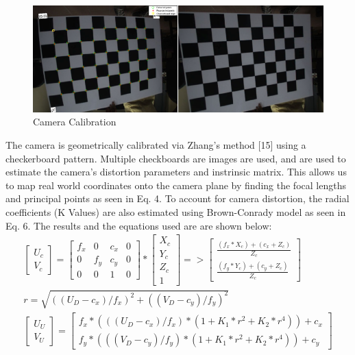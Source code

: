\documentclass[a4paper]{IEEEtran}
\begin{document}
\begin{figure}[h!]
  \centering
  \includegraphics[scale=0.3]{camera}
  \captionsetup{justification=centering}
  \caption{Camera Calibration}
\end{figure}

The camera is geometrically calibrated via Zhang’s method [15] using a checkerboard pattern. Multiple checkboards are images are used, and are used to estimate the camera’s distortion parameters and instrinsic matrix. This allows us to map real world coordinates onto the camera plane by finding the focal lengths and principal points as seen in Eq. 4. To account for camera distortion, the radial coefficients (K Values) are also estimated using Brown-Conrady model as seen in Eq. 6. The results and the equations used are are shown below:
\begingroup\makeatletter\def\f@size{7}\check@mathfonts
\begin{gather}
\left[\begin{array}{c}
U_{c}\\
V_{c}
\end{array}\right]=\left[\begin{array}{cccc}
f_{x} & 0 & c_{x} & 0\\
0 & f_{y} & c_{y} & 0\\
0 & 0 & 1 & 0
\end{array}\right]*\left[\begin{array}{c}
X_{c}\\
Y_{c}\\
Z_{c}\\
1
\end{array}\right]=>\left[\begin{array}{c}
\frac{(f_{x}*X_{c})+(c_{x}+Z_{c})}{Z_{c}}\\
\frac{(f_{y}*Y_{c})+(c_{y}+Z_{c})}{Z_{c}}
\end{array}\right] \\
r=\sqrt{((U_{D}-c_{x})/f_{x})^{2}+((V_{D}-c_{y})/f_{y})^{2}} \\
\left[\begin{array}{c}
U_{U}\\
V_{U}
\end{array}\right]=\left[\begin{array}{c}
f_{x}*(((U_{D}-c_{x})/f_{x})*(1+K_{1}*r^{2}+K_{2}*r^{4}))+c_{x}\\
f_{y}*(((V_{D}-c_{y})/f_{y})*(1+K_{1}*r^{2}+K_{2}*r^{4}))+c_{y}
\end{array}\right]
\end{gather}
\endgroup  
\end{document}
